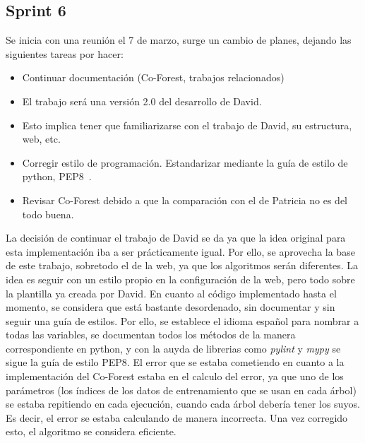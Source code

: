 \subsection{Sprint 6}
Se inicia con una reunión el 7 de marzo, surge un cambio de planes, dejando las siguientes tareas por hacer:
\begin{itemize}
	\item Continuar documentación (Co-Forest, trabajos relacionados)
	\item El trabajo será una versión 2.0 del desarrollo de David.
	\item Esto implica tener que familiarizarse con el trabajo de David, su estructura, web, etc.
	\item Corregir estilo de programación. Estandarizar mediante la guía de estilo de python, PEP8~\cite{PEP8}.
	\item Revisar Co-Forest debido a que la comparación con el de Patricia no es del todo buena.
	
\end{itemize} 
La decisión de continuar el trabajo de David se da ya que la idea original para esta implementación iba a ser prácticamente igual. Por ello, se aprovecha la base de este trabajo, sobretodo el de la web, ya que los algoritmos serán diferentes. La idea es seguir con un estilo propio en la configuración de la web, pero todo sobre la plantilla ya creada por David. 
En cuanto al código implementado hasta el momento, se considera que está bastante desordenado, sin documentar y sin seguir una guía de estilos. Por ello, se establece el idioma español para nombrar a todas las variables, se documentan todos los métodos de la manera correspondiente en python, y con la auyda de librerias como \textit{pylint} y \textit{mypy} se sigue la guía de estilo PEP8.
El error que se estaba cometiendo en cuanto a la implementación del Co-Forest estaba en el calculo del error, ya que uno de los parámetros (los índices de los datos de entrenamiento que se usan en cada árbol) se estaba repitiendo en cada ejecución, cuando cada árbol debería tener los suyos. Es decir, el error se estaba calculando de manera incorrecta. Una vez corregido esto, el algoritmo se considera eficiente.

